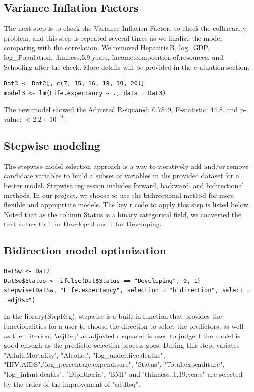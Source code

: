 \subsection{Variance Inflation Factors}

The next step is to check the Variance Inflation Factors to check the collinearity problem, and this step is repeated several times as we finalize the model comparing with the correlation. We removed Hepatitis.B, log\_GDP, log\_Population, thinness.5.9.years, Income.composition.of.resources, and Schooling after the check. More details will be provided in the evaluation section.


\begin{verbatim}
Dat3 <- Dat2[,-c(7, 15, 16, 18, 19, 20)]
model3 <- lm(Life.expectancy ~ ., data = Dat3)
\end{verbatim}
The new model showed the Adjusted R-squared: 0.7849, F-statistic:  44.8, and p-value: $< 2.2\times 10^{-16}$.


\subsection{Stepwise modeling}

The stepwise model selection approach is a way to iteratively add and/or remove candidate variables to build a subset of variables in the provided dataset for a better model. Stepwise regression includes forward, backward, and bidirectional methods. In our project, we choose to use the bidirectional method for more flexible and appropriate models. The key r code to apply this step is listed below. Noted that as the column Status is a binary categorical field, we converted the text values to 1 for Developed and 0 for Developing.

\subsection{Bidirection model optimization}

\begin{verbatim}
DatSw <- Dat2
DatSw$Status <- ifelse(Dat$Status == "Developing", 0, 1)
stepwise(DatSw, "Life.expectancy", selection = "bidirection", select = "adjRsq")
\end{verbatim}

In the library(StepReg), stepwise is a built-in function that provides the functionalities for a user to choose the direction to select the predictors, as well as the criterion. "asjRsq" as adjusted r squared is used to judge if the model is good enough as the predictor selection process goes. During this step, variates "Adult.Mortality", "Alcohol", "log\_under.five.deaths", "HIV.AIDS","log\_percentage.expenditure", "Status", "Total.expenditure", "log\_infant.deaths", "Diphtheria", "BMI" and "thinness..1.19.years" are selected by the order of the improvement of "adjRsq".

